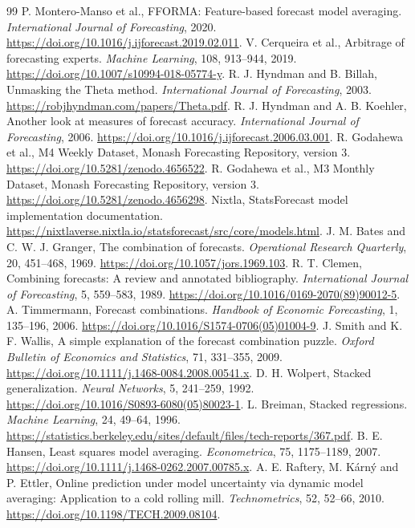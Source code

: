 \documentclass[11pt,a4paper]{article}
\begin{document}
\begin{thebibliography}{99}
\small\setlength{\itemsep}{0pt}
 P. Montero-Manso et al., FFORMA: Feature-based forecast model averaging. \emph{International Journal of Forecasting}, 2020. \url{https://doi.org/10.1016/j.ijforecast.2019.02.011}.
 V. Cerqueira et al., Arbitrage of forecasting experts. \emph{Machine Learning}, 108, 913--944, 2019. \url{https://doi.org/10.1007/s10994-018-05774-y}.
 R. J. Hyndman and B. Billah, Unmasking the Theta method. \emph{International Journal of Forecasting}, 2003. \url{https://robjhyndman.com/papers/Theta.pdf}.
 R. J. Hyndman and A. B. Koehler, Another look at measures of forecast accuracy. \emph{International Journal of Forecasting}, 2006. \url{https://doi.org/10.1016/j.ijforecast.2006.03.001}.
 R. Godahewa et al., M4 Weekly Dataset, Monash Forecasting Repository, version 3. \url{https://doi.org/10.5281/zenodo.4656522}.
 R. Godahewa et al., M3 Monthly Dataset, Monash Forecasting Repository, version 3. \url{https://doi.org/10.5281/zenodo.4656298}.
 Nixtla, StatsForecast model implementation documentation. \url{https://nixtlaverse.nixtla.io/statsforecast/src/core/models.html}.
 J. M. Bates and C. W. J. Granger, The combination of forecasts. \emph{Operational Research Quarterly}, 20, 451--468, 1969. \url{https://doi.org/10.1057/jors.1969.103}.
 R. T. Clemen, Combining forecasts: A review and annotated bibliography. \emph{International Journal of Forecasting}, 5, 559--583, 1989. \url{https://doi.org/10.1016/0169-2070(89)90012-5}.
 A. Timmermann, Forecast combinations. \emph{Handbook of Economic Forecasting}, 1, 135--196, 2006. \url{https://doi.org/10.1016/S1574-0706(05)01004-9}.
 J. Smith and K. F. Wallis, A simple explanation of the forecast combination puzzle. \emph{Oxford Bulletin of Economics and Statistics}, 71, 331--355, 2009. \url{https://doi.org/10.1111/j.1468-0084.2008.00541.x}.
 D. H. Wolpert, Stacked generalization. \emph{Neural Networks}, 5, 241--259, 1992. \url{https://doi.org/10.1016/S0893-6080(05)80023-1}.
 L. Breiman, Stacked regressions. \emph{Machine Learning}, 24, 49--64, 1996. \url{https://statistics.berkeley.edu/sites/default/files/tech-reports/367.pdf}.
 B. E. Hansen, Least squares model averaging. \emph{Econometrica}, 75, 1175--1189, 2007. \url{https://doi.org/10.1111/j.1468-0262.2007.00785.x}.
 A. E. Raftery, M. K\'arn\'y and P. Ettler, Online prediction under model uncertainty via dynamic model averaging: Application to a cold rolling mill. \emph{Technometrics}, 52, 52--66, 2010. \url{https://doi.org/10.1198/TECH.2009.08104}.

\end{thebibliography}
\end{document}
